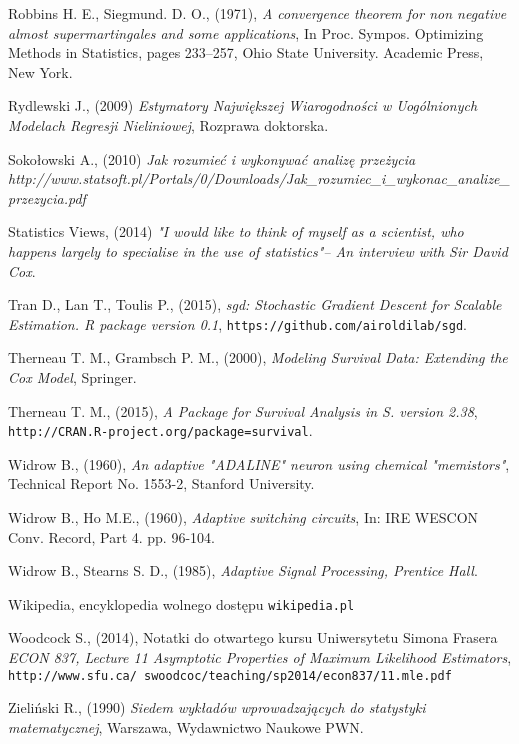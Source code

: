 \begin{thebibliography}{99}
 Robbins H. E., Siegmund. D. O., (1971), \textit{A convergence theorem for non negative almost supermartingales
and some applications}, In Proc. Sympos. Optimizing
Methods in Statistics, pages 233–257, Ohio State
University. Academic Press, New York.

 Rydlewski J., (2009) \textit{Estymatory Największej Wiarogodności w Uogólnionych Modelach Regresji Nieliniowej}, Rozprawa doktorska.

 Sokołowski A., (2010) \textit{Jak rozumieć i wykonywać analizę przeżycia} \textit{http://www.statsoft.pl/Portals/0/Downloads/Jak\_rozumiec\_i\_wykonac\_analize\_przezycia.pdf}

 Statistics Views, (2014) \textit{ "I would like to think of myself as a scientist, who happens largely to specialise in the use of statistics"– An interview with Sir David Cox}. 

 Tran D., Lan T., Toulis P., (2015), \textit{sgd: Stochastic Gradient Descent for Scalable Estimation. R package version 0.1}, \texttt{https://github.com/airoldilab/sgd}.

 Therneau T. M., Grambsch P. M., (2000), \textit{Modeling Survival Data: Extending the Cox Model}, Springer.

 Therneau T. M., (2015), \textit{A Package for Survival Analysis in S. version 2.38}, \texttt{http://CRAN.R-project.org/package=survival}.


 Widrow B., (1960), \textit{An adaptive "ADALINE" neuron using chemical "memistors"}, Technical Report No. 1553-2, Stanford University.

 Widrow B., Ho M.E., (1960), \textit{Adaptive switching circuits}, In: IRE WESCON Conv.
Record, Part 4. pp. 96-104.

 Widrow B., Stearns S. D., (1985), \textit{Adaptive Signal Processing, Prentice Hall}.

 Wikipedia, encyklopedia wolnego dostępu \texttt{wikipedia.pl}
 
  Woodcock S., (2014), Notatki do otwartego kursu Uniwersytetu Simona Frasera \textit{ECON 837, Lecture 11 Asymptotic Properties of Maximum Likelihood Estimators}, \\ \texttt{http://www.sfu.ca/~swoodcoc/teaching/sp2014/econ837/11.mle.pdf}
 
 Zieliński R., (1990) \textit{Siedem wykładów wprowadzających do statystyki matematycznej}, Warszawa, Wydawnictwo Naukowe PWN.


\end{thebibliography}